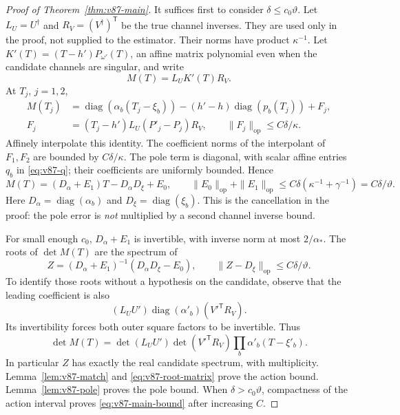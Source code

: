 \documentclass[11pt,reqno]{amsart}
\numberwithin{equation}{section}
\theoremstyle{definition}\newtheorem{definition}[theorem]{Definition}
\theoremstyle{remark}\newtheorem{remark}[theorem]{Remark}
\newcommand{\diag}{\operatorname{diag}}
\newcommand{\op}{\mathrm{op}}
\newcommand{\sig}{\vartheta}
\begin{document}
\begin{proof}[Proof of Theorem~\ref{thm:v87-main}]
It suffices first to consider $\delta\le c_0\sig$.
Let $L_U=U^\dagger$ and $R_V=(V^\dagger)^{\mathsf T}$ be the
true channel inverses. They are used only in the proof, not supplied
to the estimator. Their norms have product $\kappa^{-1}$.
Let $K'(T)=(T-h')P_{\omega'}(T)$, an affine matrix polynomial even
when the candidate channels are singular, and write
\[
                         M(T)=L_UK'(T)R_V.
\]
At $T_j$, $j=1,2$,
\begin{align}
 M(T_j)&=\diag(\alpha_b(T_j-\xi_b))
        -(h'-h)\diag(p_b(T_j))+F_j,\nonumber\\
 F_j&=(T_j-h')L_U(P'_j-P_j)R_V,
              \qquad \|F_j\|_\op\le C\delta/\kappa.
                                                    \label{eq:v87-whiten}
\end{align}
Affinely interpolate this identity. The coefficient norms of the
interpolant of $F_1,F_2$ are bounded by $C\delta/\kappa$.
The pole term is diagonal, with scalar affine entries $q_b$ in
\eqref{eq:v87-q}; their coefficients are uniformly bounded. Hence
\begin{equation}\label{eq:v87-coefficients}
 M(T)=(D_\alpha+E_1)T-D_\alpha D_\xi+E_0,
 \qquad \|E_0\|_\op+\|E_1\|_\op
       \le C\delta(\kappa^{-1}+\gamma^{-1})=C\delta/\sig.
\end{equation}
Here $D_\alpha=\diag(\alpha_b)$ and $D_\xi=\diag(\xi_b)$.
This is the cancellation in the proof: the pole error is \emph{not}
multiplied by a second channel inverse bound.

For small enough $c_0$, $D_\alpha+E_1$ is invertible, with inverse
norm at most $2/\alpha_*$. The roots of $\det M(T)$ are the
spectrum of
\begin{equation}\label{eq:v87-root-matrix}
 Z=(D_\alpha+E_1)^{-1}(D_\alpha D_\xi-E_0),\qquad
            \|Z-D_\xi\|_\op\le C\delta/\sig.
\end{equation}
To identify those roots without a hypothesis on the candidate, observe
that the leading coefficient is also
\[
                 (L_UU')\diag(\alpha'_b)(V'^{\mathsf T}R_V).
\]
Its invertibility forces both outer square factors to be invertible.
Thus
\[
 \det M(T)=\det(L_UU')\det(V'^{\mathsf T}R_V)
                         \prod_b\alpha'_b(T-\xi'_b).
\]
In particular $Z$ has exactly the real candidate spectrum, with
multiplicity. Lemma~\ref{lem:v87-match} and
\eqref{eq:v87-root-matrix} prove the action bound.
Lemma~\ref{lem:v87-pole} proves the pole bound. When
$\delta>c_0\sig$, compactness of the action interval proves
\eqref{eq:v87-main-bound} after increasing $C$.


\end{proof}
\end{document}
